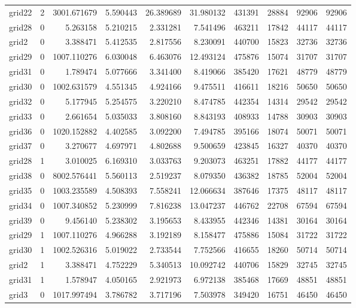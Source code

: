 \begin{longtable}{|l|r|r|r|r|r|r|r|r|r|}
grid22 & 2 & 3001.671679 & 5.590443 & 26.389689 & 31.980132 & 431391 & 28884 & 92906 & 92906 \\
grid28 & 0 & 5.263158 & 5.210215 & 2.331281 & 7.541496 & 463211 & 17842 & 44117 & 44117 \\
grid2 & 0 & 3.388471 & 5.412535 & 2.817556 & 8.230091 & 440700 & 15823 & 32736 & 32736 \\
grid29 & 0 & 1007.110276 & 6.030048 & 6.463076 & 12.493124 & 475876 & 15074 & 31707 & 31707 \\
grid31 & 0 & 1.789474 & 5.077666 & 3.341400 & 8.419066 & 385420 & 17621 & 48779 & 48779 \\
grid30 & 0 & 1002.631579 & 4.551345 & 4.924166 & 9.475511 & 416611 & 18216 & 50650 & 50650 \\
grid32 & 0 & 5.177945 & 5.254575 & 3.220210 & 8.474785 & 442354 & 14314 & 29542 & 29542 \\
grid33 & 0 & 2.661654 & 5.035033 & 3.808160 & 8.843193 & 408933 & 14788 & 30903 & 30903 \\
grid36 & 0 & 1020.152882 & 4.402585 & 3.092200 & 7.494785 & 395166 & 18074 & 50071 & 50071 \\
grid37 & 0 & 3.270677 & 4.697971 & 4.802688 & 9.500659 & 423845 & 16327 & 40370 & 40370 \\
grid28 & 1 & 3.010025 & 6.169310 & 3.033763 & 9.203073 & 463251 & 17882 & 44177 & 44177 \\
grid38 & 0 & 8002.576441 & 5.560113 & 2.519237 & 8.079350 & 436382 & 18785 & 52004 & 52004 \\
grid35 & 0 & 1003.235589 & 4.508393 & 7.558241 & 12.066634 & 387646 & 17375 & 48117 & 48117 \\
grid34 & 0 & 1007.340852 & 5.230999 & 7.816238 & 13.047237 & 446762 & 22708 & 67594 & 67594 \\
grid39 & 0 & 9.456140 & 5.238302 & 3.195653 & 8.433955 & 442346 & 14381 & 30164 & 30164 \\
grid29 & 1 & 1007.110276 & 4.966288 & 3.192189 & 8.158477 & 475886 & 15084 & 31722 & 31722 \\
grid30 & 1 & 1002.526316 & 5.019022 & 2.733544 & 7.752566 & 416655 & 18260 & 50714 & 50714 \\
grid2 & 1 & 3.388471 & 4.752229 & 5.340513 & 10.092742 & 440706 & 15829 & 32745 & 32745 \\
grid31 & 1 & 1.578947 & 4.050165 & 2.921973 & 6.972138 & 385468 & 17669 & 48851 & 48851 \\
grid3 & 0 & 1017.997494 & 3.786782 & 3.717196 & 7.503978 & 349420 & 16751 & 46450 & 46450 \\

\end{longtable}
